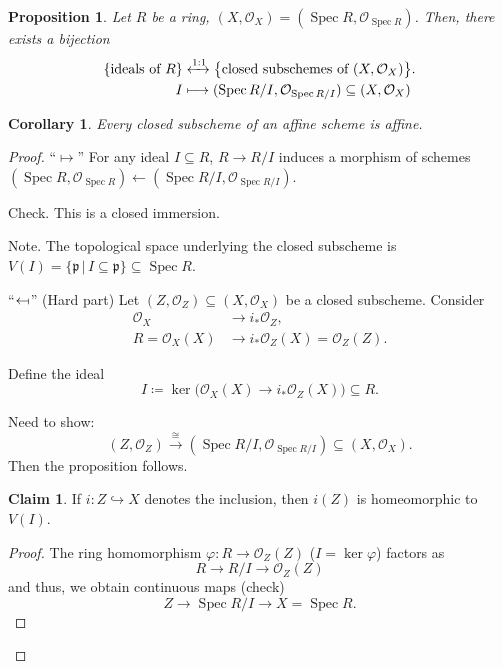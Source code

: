 \documentclass[12pt]{article}
\DeclareMathOperator{\Spec}{Spec}
\newtheorem*{proposition}{Proposition}
\newtheorem*{corollary}{Corollary}
\theoremstyle{definition}
\newtheorem{claim+}{Claim}
\theoremstyle{remark}
\begin{document}
\begin{proposition}
Let $R$ be a ring, $(X,\mathcal{O}_X)=(\Spec R,\mathcal{O}_{\Spec R})$. Then, there exists a bijection
\begin{align*}
\{\text{ideals of }R\}&\xleftrightarrow{1:1}\big\{\text{closed subschemes of }(X,\mathcal{O}_X)\big\}.\\
I&\longmapsto(\Spec R/I,\mathcal{O}_{\Spec R/I})\subseteq(X,\mathcal{O}_X)
\end{align*}
\end{proposition}

\begin{corollary}
Every closed subscheme of an affine scheme is affine.
\end{corollary}

\begin{proof}
``$\mapsto$'' For any ideal $I\subseteq R$, $R\rightarrow R/I$ induces a morphism of schemes $(\Spec R,\mathcal{O}_{\Spec R})\leftarrow(\Spec R/I,\mathcal{O}_{\Spec R/I})$.

Check. This is a closed immersion.

Note. The topological space underlying the closed subscheme is $V(I)=\{\mathfrak{p}\,|\,I\subseteq\mathfrak{p}\}\subseteq\Spec R$.

``$\leftarrow\!\shortmid$'' (Hard part) Let $(Z,\mathcal{O}_Z)\subseteq(X,\mathcal{O}_X)$ be a closed subscheme. Consider
\begin{align*}
\mathcal{O}_X&\longrightarrow i_*\mathcal{O}_Z,\\
R=\mathcal{O}_X(X)&\longrightarrow i_*\mathcal{O}_Z(X)=\mathcal{O}_Z(Z).
\end{align*}

Define the ideal
\[I\coloneqq\ker\big(\mathcal{O}_X(X)\rightarrow i_*\mathcal{O}_Z(X)\big)\subseteq R.\]

Need to show:
\[(Z,\mathcal{O}_Z)\overset{\cong}{\longrightarrow}(\Spec R/I,\mathcal{O}_{\Spec R/I})\subseteq(X,\mathcal{O}_X).\]
Then the proposition follows.

\begin{claim+}
If $i:Z\hookrightarrow X$ denotes the inclusion, then $i(Z)$ is homeomorphic to $V(I)$.
\end{claim+}

\begin{proof}
The ring homomorphism $\varphi:R\rightarrow\mathcal{O}_Z(Z)$ ($I=\ker\varphi$) factors as
\[R\longrightarrow R/I\longrightarrow\mathcal{O}_Z(Z)\]
and thus, we obtain continuous maps (check)
\[Z\longrightarrow\Spec R/I\longrightarrow X=\Spec R.\]


\end{proof}
\end{proof}
\end{document}
